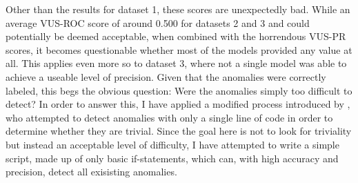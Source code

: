 \documentclass[12pt,oneside]{article}
\begin{document}
Other than the results for dataset 1, these scores are unexpectedly bad. While an average VUS-ROC score of around 0.500 for datasets 2 and 3 and could potentially be deemed acceptable, when combined with the horrendous VUS-PR scores, it becomes questionable whether most of the models provided any value at all. This applies even more so to dataset 3, where not a single model was able to achieve a useable level of precision. Given that the anomalies were correctly labeled, this begs the obvious question: Were the anomalies simply too difficult to detect? In order to answer this, I have applied a modified process introduced by \cite{wu2021current}, who attempted to detect anomalies with only a single line of code in order to determine whether they are trivial. Since the goal here is not to look for triviality but instead an acceptable level of difficulty, I have attempted to write a simple script, made up of only basic if-statements, which can, with high accuracy and precision, detect all exisisting anomalies. \par
\end{document}
